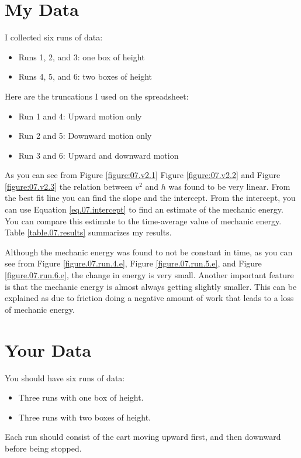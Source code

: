 \section{My Data}
%
I collected six runs of data:
\begin{itemize}
    \item Runs 1, 2, and 3: one box of height
    \item Runs 4, 5, and 6: two boxes of height
\end{itemize}
Here are the truncations I used on the spreadsheet:
\begin{itemize}
    \item Run 1 and 4: Upward motion only
    \item Run 2 and 5: Downward motion only
    \item Run 3 and 6: Upward and downward motion
\end{itemize}
As you can see from Figure \ref{figure:07.v2.1} Figure \ref{figure:07.v2.2} and Figure \ref{figure:07.v2.3} the relation between $v^{2}$ and $h$ was found to be very linear. From the best fit line you can find the slope and the intercept. From the intercept, you can use Equation \ref{eq.07.intercept} to find an estimate of the mechanic energy. You can compare this estimate to the time-average value of mechanic energy. Table \ref{table.07.results} summarizes my results.

Although the mechanic energy was found to not be constant in time, as you can see from Figure \ref{figure.07.run.4.e}, Figure \ref{figure.07.run.5.e}, and Figure \ref{figure.07.run.6.e}, the change in energy is very small. Another important feature is that the mechanic energy is almost always getting slightly smaller. This can be explained as due to friction doing a negative amount of work that leads to a loss of mechanic energy.
%
\section{Your Data}
%
You should have six runs of data:
\begin{itemize}
    \item Three runs with one box of height.
    \item Three runs with two boxes of height.
\end{itemize}
Each run should consist of the cart moving upward first, and then downward before being stopped.
%
\newpage
